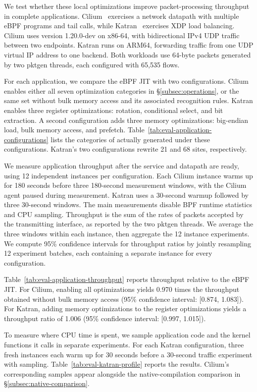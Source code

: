 We test whether these local optimizations improve packet-processing throughput in complete applications. Cilium~\cite{cilium} exercises a network datapath with multiple eBPF programs and tail calls, while Katran~\cite{katran} exercises XDP load balancing. Cilium uses version 1.20.0-dev on x86-64, with bidirectional IPv4 UDP traffic between two endpoints. Katran runs on ARM64, forwarding traffic from one UDP virtual IP address to one backend. Both workloads use 64-byte packets generated by two pktgen threads, each configured with 65,535 flows.

For each application, we compare the eBPF JIT with two \tool configurations. Cilium enables either all seven optimization categories in \S\ref{subsec:operations}, or the same set without bulk memory access and its associated recognition rules. Katran enables three register optimizations: rotation, conditional select, and bit extraction. A second configuration adds three memory optimizations: big-endian load, bulk memory access, and prefetch. Table~\ref{tab:eval-application-configurations} lists the categories of \kinsns actually generated under these configurations. Katran's two configurations rewrite 21 and 68 sites, respectively.

We measure application throughput after the service and datapath are ready, using 12 independent instances per configuration. Each Cilium instance warms up for 180 seconds before three 180-second measurement windows, with the Cilium agent paused during measurement. Katran uses a 30-second warmup followed by three 30-second windows. The main measurements disable BPF runtime statistics and CPU sampling. Throughput is the sum of the rates of packets accepted by the transmitting interface, as reported by the two pktgen threads. We average the three windows within each instance, then aggregate the 12 instance experiments. We compute 95\% confidence intervals for throughput ratios by jointly resampling 12 experiment batches, each containing a separate instance for every configuration.

Table~\ref{tab:eval-application-throughput} reports throughput relative to the eBPF JIT. For Cilium, enabling all optimizations yields 0.970 times the throughput obtained without bulk memory access (95\% confidence interval: [0.874, 1.083]). For Katran, adding memory optimizations to the register optimizations yields a throughput ratio of 1.006 (95\% confidence interval: [0.997, 1.015]).

To measure where CPU time is spent, we sample application code and the kernel functions it calls in separate experiments. For each Katran configuration, three fresh instances each warm up for 30 seconds before a 30-second traffic experiment with sampling. Table~\ref{tab:eval-katran-profile} reports the results. Cilium's corresponding samples appear alongside the native-compilation comparison in \S\ref{subsec:native-comparison}.

